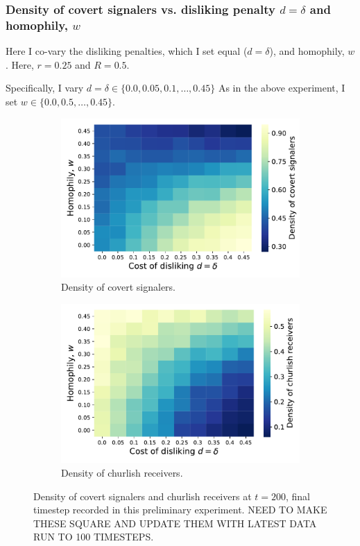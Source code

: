 \documentclass[11pt,letterpaper]{article}
\begin{document}
\subsubsection{Density of covert signalers vs. disliking penalty $d=\delta$ and homophily, $w$}

Here I co-vary the disliking penalties, which I set equal ($d=\delta$), and
homophily, $w$. Here, $r=0.25$ and $R=0.5$. 

Specifically, I vary $d=\delta \in \{0.0, 0.05, 0.1, \ldots, 0.45\}$
As in the above experiment, I set $w \in \{0.0, 0.5, \ldots, 0.45\}$.

\begin{figure}[H]
  \centering
  \begin{subfigure}{0.49\textwidth}
    \centering
    \includegraphics[width=\textwidth]{prelim/Figures/covertDensityVsDislikingHomophilyCoevo.pdf}
    \caption{Density of covert signalers.}
  \end{subfigure}
  \begin{subfigure}{0.49\textwidth}
    \centering
    \includegraphics[width=\textwidth]{prelim/Figures/churlishDensityVsDislikingHomophilyCoevo.pdf}
    \caption{Density of churlish receivers.}
  \end{subfigure}
  
  \caption{Density of covert signalers and churlish receivers at $t=200$, 
    final timestep recorded in this preliminary experiment. NEED TO MAKE THESE
    SQUARE AND UPDATE THEM WITH LATEST DATA RUN TO 100 TIMESTEPS.}
  \label{fig:dislikingHomophilyHeatmap}
\end{figure}
\end{document}
